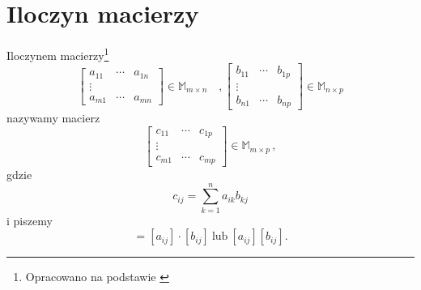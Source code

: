\section{Iloczyn macierzy}
\begin{definicja}
Iloczynem macierzy\footnote{Opracowano na podstawie \citep[s. 88]{Repetytorium1977}}
\begin{equation*}
\begin{bmatrix}
a_{11} & \cdots & a_{1n} \\
\vdots \\
a_{m1} & \cdots & a_{mn}
\end{bmatrix}
\in \mathbb{M}_{m \times n} \quad ,
\begin{bmatrix}
b_{11} & \cdots & b_{1p} \\
\vdots \\
b_{n1} & \cdots & b_{np}
\end{bmatrix}
\in \mathbb{M}_{n \times p} 
\end{equation*}
nazywamy macierz
\begin{equation*}
\begin{bmatrix}
c_{11} & \cdots & c_{1p} \\
\vdots \\
c_{m1} & \cdots & c_{mp}
\end{bmatrix}
\in \mathbb{M}_{m \times p} \, ,
\end{equation*}
gdzie 
\begin{equation*}
    c_{ij} = \sum^{n}_{k=1} a_{ik} b_{kj}
\end{equation*}
i piszemy
\begin{equation*}
    [c_{ij}] = [a_{ij}] \cdot [b_{ij}] \ \text{lub} \ [a_{ij}][b_{ij}].
\end{equation*}
\end{definicja}
